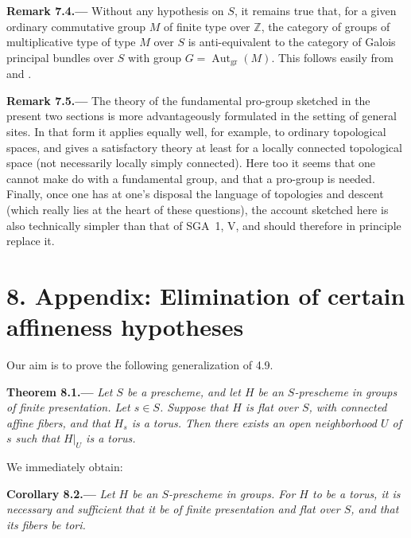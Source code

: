 \par\medskip\noindent{}\textbf{Remark 7.4.---}\enspace
Without any hypothesis on \(S\), it remains true that, for a given ordinary
commutative group \(M\) of finite type over \(\mathbb{Z}\), the category of
groups of multiplicative type of type \(M\) over \(S\) is anti-equivalent
to the category of Galois principal bundles over \(S\) with group
\(G=\operatorname{Aut}_{\mathrm{gr}}(M)\). This follows easily from 
and .

\par\medskip\noindent{}\textbf{Remark 7.5.---}\enspace
The theory of the fundamental pro-group sketched in the present two
sections is more advantageously formulated in the setting of general
sites. In that form it applies equally well, for example, to ordinary
topological spaces, and gives a satisfactory theory at least for a locally
connected topological space (not necessarily locally simply connected).
Here too it seems that one cannot make do with a fundamental group, and
that a pro-group is needed. Finally, once one has at one's disposal the
language of topologies and descent (which really lies at the heart of these
questions), the account sketched here is also technically simpler than
that of SGA~1, V, and should therefore in principle replace it.

\section*{8. Appendix: Elimination of certain affineness hypotheses}

Our aim is to prove the following generalization of 4.9.

\par\medskip\noindent{}\textbf{Theorem 8.1.---}\enspace
\emph{Let \(S\) be a prescheme, and let \(H\) be an \(S\)-prescheme in
groups of finite presentation. Let \(s\in S\). Suppose that \(H\) is flat
over \(S\), with connected affine fibers, and that \(H_s\) is a torus. Then
there exists an open neighborhood \(U\) of \(s\) such that \(H|_U\) is a
torus.}

We immediately obtain:

\par\medskip\noindent{}\textbf{Corollary 8.2.---}\enspace
\emph{Let \(H\) be an \(S\)-prescheme in groups. For \(H\) to be a torus,
it is necessary and sufficient that it be of finite presentation and flat
over \(S\), and that its fibers be tori.}

